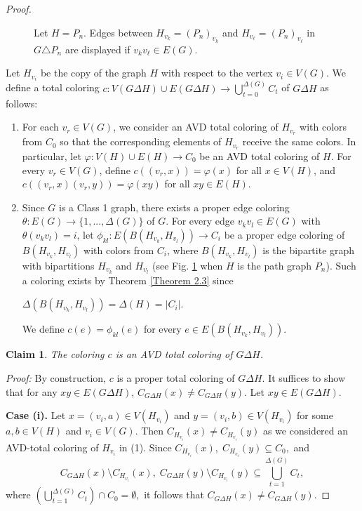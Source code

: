 \documentclass[12pt]{article}
\theoremstyle{definition}
\newtheorem{claim}{Claim}
\begin{document}
\begin{proof}
\begin{figure}[ht]
\begin{tikzpicture}[scale=1.2]
    \end{tikzpicture}
    \caption{Let $H=P_n$. Edges between $H_{v_k}=(P_n)_{v_k}$ and $H_{v_\ell}=(P_n)_{v_\ell}$ in $G \triangle P_n$ are displayed if $v_k v_\ell \in E(G)$.}
    \label{Figure 3}
\end{figure}

Let $H_{v_i}$ be the copy of the graph $H$ with respect to the vertex $v_i\in V(G)$.
We define a total coloring $c:V(G\Delta H)\cup E(G\Delta H)\rightarrow 
\bigcup\limits_{t=0}^{\Delta(G)} C_t$ of $G\Delta H$ as follows:
\begin{enumerate}
\item For each $v_r\in V(G)$, we consider an AVD total coloring of $H_{v_r}$ with colors from $C_0$ so that the corresponding elements of $H_{v_r}$ receive the same colors. In particular, let
$
\varphi:V(H)\cup E(H)\rightarrow C_0
$
be an AVD total coloring of \(H\). For every \(v_r\in V(G)\), define
$c((v_r,x))=\varphi(x)$ for all $x\in V(H)$,
and
$c((v_r,x)(v_r,y))=\varphi(xy)$ for all $xy\in E(H)$.  


\item Since $G$ is a Class 1 graph, there exists a proper edge coloring $\theta:E(G)\rightarrow \{1,...,\Delta(G)\}$ of $G$.
For every edge $v_kv_l\in E(G)$ with $\theta(v_kv_l)=i$, 
let $\phi_{kl}: E(B(H_{v_k},H_{v_l})) \rightarrow C_i$ be a proper edge coloring of $B(H_{v_k},H_{v_l})$ with colors from $C_i$, where $B(H_{v_k},H_{v_l})$ is the bipartite graph with bipartitions $H_{v_k}$ and $H_{v_l}$ (see Fig. \ref{Figure 3} when $H$ is the path graph $P_n$). Such a coloring exists by Theorem \ref{Theorem 2.3} since
\begin{center}
$
\Delta(B(H_{v_k},H_{v_l}))
=
\Delta(H)
=
|C_i|.
$
\end{center}
We define $c(e)=\phi_{kl}(e)$ for every $e\in E(B(H_{v_k},H_{v_l}))$.
\end{enumerate}


\begin{claim}\label{Claim 4}
{\em The coloring $c$ is an AVD total coloring of $G\Delta H$.}
\end{claim}

\textit{Proof:}
By construction, $c$ is a proper total coloring of $G\Delta H$.
It suffices to show that for any $xy\in E(G\Delta H)$,
$
C_{G\Delta H}(x)\neq C_{G\Delta H}(y)
$. 
Let $xy\in E(G\Delta H)$.

\textbf{Case (i).} 
Let $x=(v_i,a)\in V(H_{v_i})$ and $y=(v_i,b)\in V(H_{v_i})$ for some $a,b\in V(H)$ and $v_{i} \in V(G)$.
Then $C_{H_{v_i}}(x)\neq C_{H_{v_i}}(y)$
as we considered an AVD-total coloring of $H_{v_i}$ in (1).
Since
$
C_{H_{v_i}}(x),\; C_{H_{v_i}}(y)\subseteq C_0,
$
and
\[
C_{G\Delta H}(x)\setminus C_{H_{v_i}}(x),\;
C_{G\Delta H}(y)\setminus C_{H_{v_i}}(y)
\subseteq \bigcup_{t=1}^{\Delta(G)} C_t,
\]
where
$
\left(\bigcup_{t=1}^{\Delta(G)} C_t\right)\cap C_0=\emptyset,
$
it follows that
$
C_{G\Delta H}(x)\neq C_{G\Delta H}(y).
$


\end{proof}
\end{document}
